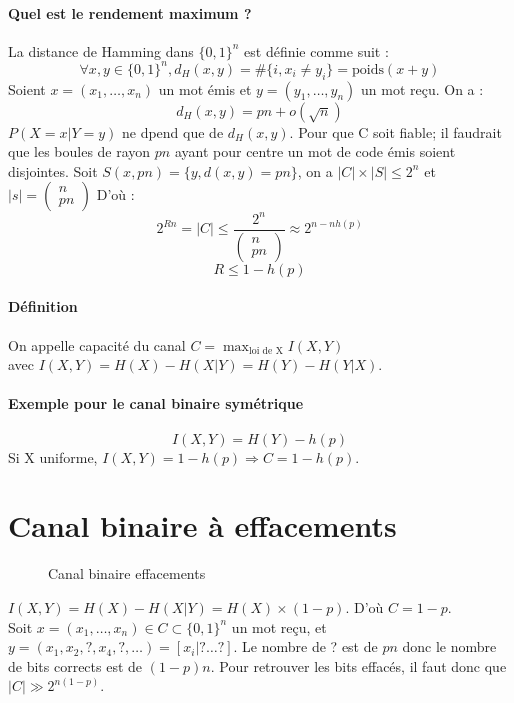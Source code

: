 \documentclass[12pt,a4paper]{report}
\begin{document}
\paragraph{Quel est le rendement maximum ?\\}
La distance de Hamming dans $\{0,1\}^n$ est définie comme suit :
$$ \forall x,y \in \{0,1\}^n, d_H(x,y) = \# \{i,x_i \neq y_i\} = \mbox{poids}(x+y) $$
Soient $x=(x_1,\ldots,x_n)$ un mot émis et $y=(y_1,\ldots,y_n)$ un mot reçu. On a :
$$ d_H(x,y) = pn + o(\sqrt{n})$$
$P(X=x|Y=y)$ ne dpend que de $d_H(x,y)$. Pour que C soit fiable; il faudrait que les boules de rayon $pn$ ayant pour centre un mot de code émis soient disjointes.
Soit $ S(x,pn)=\{y,d(x,y)=pn\}$, on a $ |C|\times |S| \leqslant 2^n$ et $ |s| = \left(\begin{array}{c}
																			n \\
																			pn 
																			\end{array}\right)$
D'où : 
$$ 2^{Rn}=|C| \leqslant \frac{2^n}{\left(\begin{array}{c}
									n \\
									pn 
									\end{array}\right)} \approx 2^{n-nh(p)}$$
$$ R \leqslant 1-h(p)$$
\paragraph{Définition\\}
On appelle capacité du canal $\displaystyle C = \max_{\mbox{loi de X}} I(X,Y)$\\ avec $I(X,Y)=H(X)-H(X|Y)=H(Y)-H(Y|X)$.
\paragraph{Exemple pour le canal binaire symétrique\\}
$$I(X,Y)=H(Y)-h(p)$$
Si X uniforme, $ I(X,Y)=1-h(p) \Longrightarrow C = 1 - h(p) $.
\section{Canal binaire à effacements\\}
\begin{figure}[h]
	\centering
  \scalebox{0.8}{}	
  \caption{Canal binaire  effacements}
\end{figure}
$I(X,Y) = H(X) - H(X|Y) = H(X)\times (1-p)$. 
D'où $ C =1 - p $.\\
Soit $x=(x_1,\ldots,x_n) \in C \subset \{0,1\}^n $ un mot reçu, et $y=(x_1,x_2,?,x_4,?,\ldots) = [x_i | ? \ldots ?]$. Le nombre de ? est de $pn$ donc le nombre de bits corrects est de $(1-p)n$. Pour retrouver les bits effacés, il faut donc que $|C| \gg 2^{n(1-p)}$.
\end{document}
